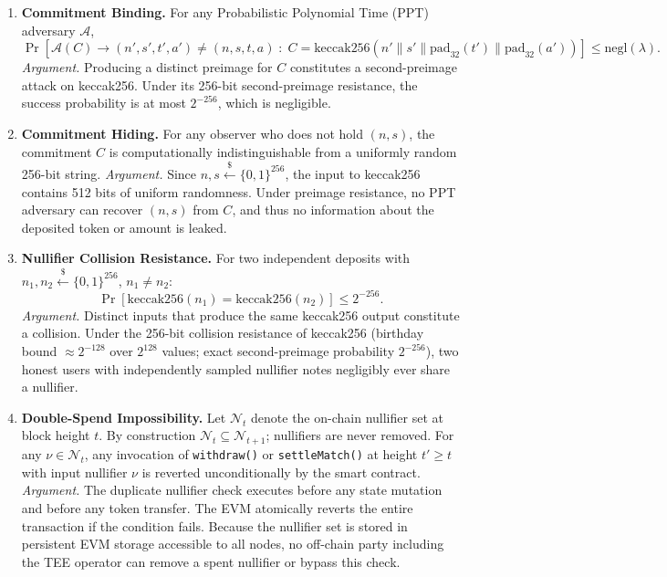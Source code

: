 \documentclass[12pt,a4paper]{article}
\begin{document}
\begin{enumerate}

\item \textbf{Commitment Binding.} For any Probabilistic Polynomial Time (PPT) adversary $\mathcal{A}$,
$$
\Pr\!\left[\mathcal{A}(C) \to (n', s', t', a') \neq (n, s, t, a) \;:\; C = \mathrm{keccak256}\!\left(n' \| s' \| \mathrm{pad}_{32}(t') \| \mathrm{pad}_{32}(a')\right)\right] \leq \mathrm{negl}(\lambda).
$$
\textit{Argument.} Producing a distinct preimage for $C$ constitutes a second-preimage attack on keccak256. Under its 256-bit second-preimage resistance, the success probability is at most $2^{-256}$, which is negligible.

\item \textbf{Commitment Hiding.} For any observer who does not hold $(n, s)$, the commitment $C$ is computationally indistinguishable from a uniformly random 256-bit string.
\textit{Argument.} Since $n, s \xleftarrow{\$} \{0,1\}^{256}$, the input to keccak256 contains 512 bits of uniform randomness. Under preimage resistance, no PPT adversary can recover $(n, s)$ from $C$, and thus no information about the deposited token or amount is leaked.

\item \textbf{Nullifier Collision Resistance.} For two independent deposits with $n_1, n_2 \xleftarrow{\$} \{0,1\}^{256}$, $n_1 \neq n_2$:
$$
\Pr\!\left[\mathrm{keccak256}(n_1) = \mathrm{keccak256}(n_2)\right] \leq 2^{-256}.
$$
\textit{Argument.} Distinct inputs that produce the same keccak256 output constitute a collision. Under the 256-bit collision resistance of keccak256 (birthday bound $\approx 2^{-128}$ over $2^{128}$ values; exact second-preimage probability $2^{-256}$), two honest users with independently sampled nullifier notes negligibly ever share a nullifier.

\item \textbf{Double-Spend Impossibility.} Let $\mathcal{N}_t$ denote the on-chain nullifier set at block height $t$. By construction $\mathcal{N}_t \subseteq \mathcal{N}_{t+1}$; nullifiers are never removed. For any $\nu \in \mathcal{N}_t$, any invocation of \texttt{withdraw()} or \texttt{settleMatch()} at height $t' \geq t$ with input nullifier $\nu$ is reverted unconditionally by the smart contract.
\textit{Argument.} The duplicate nullifier check executes before any state mutation and before any token transfer. The EVM atomically reverts the entire transaction if the condition fails. Because the nullifier set is stored in persistent EVM storage accessible to all nodes, no off-chain party including the TEE operator can remove a spent nullifier or bypass this check.


\end{enumerate}
\end{document}
